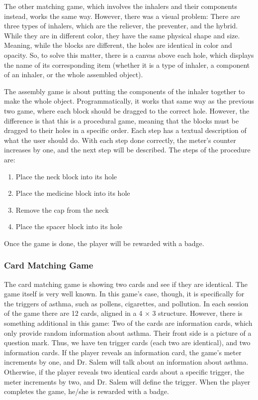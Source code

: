 The other matching game, which involves the inhalers and their components instead, works the same way. However, there was a visual problem: There are three types of inhalers, which are the reliever, the preventer, and the hybrid. While they are in different color, they have the same physical shape and size. Meaning, while the blocks are different, the holes are identical in color and opacity. So, to solve this matter, there is a canvas above each hole, which displays the name of its corresponding item (whether it is a type of inhaler, a component of an inhaler, or the whole assembled object).

The assembly game is about putting the components of the inhaler together to make the whole object. Programmatically, it works that same way as the previous two game, where each block should be dragged to the correct hole. However, the difference is that this is a procedural game, meaning that the blocks must be dragged to their holes in a specific order. Each step has a textual description of what the user should do. With each step done correctly, the meter’s counter increases by one, and the next step will be described. The steps of the procedure are:
\begin{enumerate}
\item{Place the neck block into its hole}
\item{Place the medicine block into its hole}
\item{Remove the cap from the neck}
\item{Place the spacer block into its hole}
\end{enumerate}
Once the game is done, the player will be rewarded with a badge.
\subsubsection*{Card Matching Game}
The card matching game is showing two cards and see if they are identical. The game itself is very well known. In this game’s case, though, it is specifically for the triggers of asthma, such as pollens, cigarettes, and pollution. In each session of the game there are 12 cards, aligned in a 4 × 3 structure. However, there is something additional in this game: Two of the cards are information cards, which only provide random information about asthma. Their front side is a picture of a question mark. Thus, we have ten trigger cards (each two are identical), and two information cards. If the player reveals an information card, the game’s meter increments by one, and Dr. Salem will talk about an information about asthma. Otherwise, if the player reveals two identical cards about a specific trigger, the meter increments by two, and Dr. Salem will define the trigger. When the player completes the game, he/she is rewarded with a badge.

